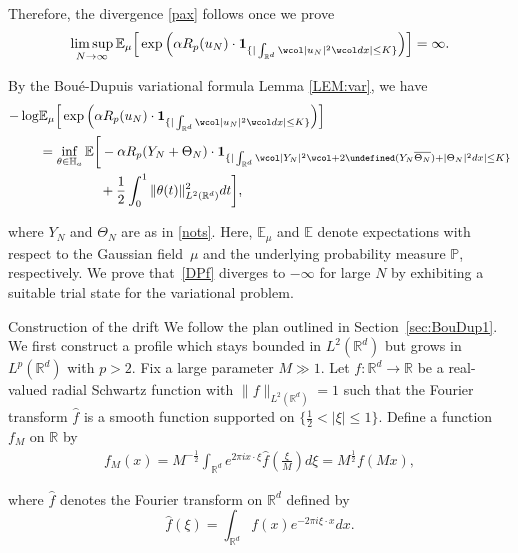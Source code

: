 \documentclass[%
11pt,  reqno]{amsart}
\makeatletter
\theoremstyle{remarkstyle}
\newcommand{\1}{\hspace{0.2mm}\text{I}\hspace{0.2mm}}
\newcommand{\noi}{\noindent}
\newcommand{\R}{\mathbb{R}}
\let\Re=\undefined\DeclareMathOperator*{\Re}{Re}
\newcommand{\E}{\mathbb{E}}
\newcommand{\al}{\alpha}
\newcommand{\ft}{\widehat}
\newcommand{\cj}{\overline}
\newcommand{\wick}[1]{\wcol#1\wcol}
\newcommand{\ind}{\mathbf 1}
\newcommand{\PP}{\mathbb{P}}
\numberwithin{equation}{section}
\numberwithin{theorem}{section}
\newcommand{\dr}{\theta}
\def\subsubsection{\@startsection{subsubsection}{3}%
	\z@{.5\linespacing\@plus.7\linespacing}{-.5em}%
	{\normalfont\bfseries}}
\makeatother
\begin{document}
	\noi
	Therefore, the  divergence \eqref{pax} follows once we prove
	\begin{align}
		\limsup_{N\to \infty}  \E_\mu\Big[\exp\Big( \al R_p(u_N)
		\cdot \ind_{\{ |\int_{{\R^d}} \wick{ |u_N|^2 } dx | \le K\}}\Big)   \Big] =  \infty.
		\label{pa0}
	\end{align}
	
	\noi
	By  the  Bou\'e-Dupuis variational formula Lemma \ref{LEM:var}, we have
	\begin{align}
		\begin{split}
			- \log & {\E_\mu\Big[\exp\Big( \al  R_p(u_N)
				\cdot \ind_{\{ |\int_{{\R^d}} \wick{ |u_N|^2 } dx | \le K\}}\Big)   \Big]} \\
			&= \inf_{\dr \in \mathbb H_a} \E\bigg[ - \al R_p (Y_N + \Theta_N) \cdot \ind_{\{ |\int_{{\R^d}} \wick{ | Y_N|^2} 
				+ 2\Re (Y_N  \cj{\Theta_N} ) + |\Theta_N|^2 dx | \le K\}} \\
			&\hphantom{XXXXX}
			+ \frac 12 \int_0^1 \| \dr(t)\|_{L^2(\R^d)} ^2 dt \bigg],
			\label{DPf}
		\end{split}
	\end{align}
	
	\noi
	where $Y_N$ and $\Theta_N$ are as in \eqref{nots}.
	Here,  $\E_\mu$ and $\E$ denote expectations
	with respect to the Gaussian field~$\mu$
	and the underlying probability measure $\PP$, respectively. We prove that~\eqref{DPf} diverges to $-\infty$ for large $N$ by exhibiting a suitable trial state for the variational problem. 
	
	
	
	\subsubsection{Construction of the drift}
	We follow the plan outlined in Section~\ref{sec:BouDup1}. We first construct a profile which stays bounded in $L^2(\R^d)$ but grows in $L^p(\R^d)$ with $p > 2$.
	Fix a large parameter $M \gg 1$.
	Let $f: {\R^d} \to \R$ be a real-valued radial Schwartz function
	with $\|f\|_{L^2 (\R^d)} = 1$
	such that 
	the Fourier transform $\ft f$ is a smooth function
	supported  on $\big\{\frac 12 <  |\xi| \le 1 \big\}$.
	Define a function $f_{M}$  on ${\R}$ by 
	\begin{align}
		f_{M}(x) =  M^{-\frac{1}2} \int_{\R^d} e^{2\pi ix\cdot \xi} \ft f(\tfrac{\xi}M) d\xi = M^{\frac{1}2} f(Mx), 
		\label{fMdef} 
	\end{align}
	
	
	\noi
	where $\ft f$ denotes the Fourier transform on ${\R^d}$ defined by 
	\[ \ft f(\xi) =  \int_{{\R^d}} f(x) e^{-2\pi  i\xi \cdot x} dx.\]
	
\end{document}
